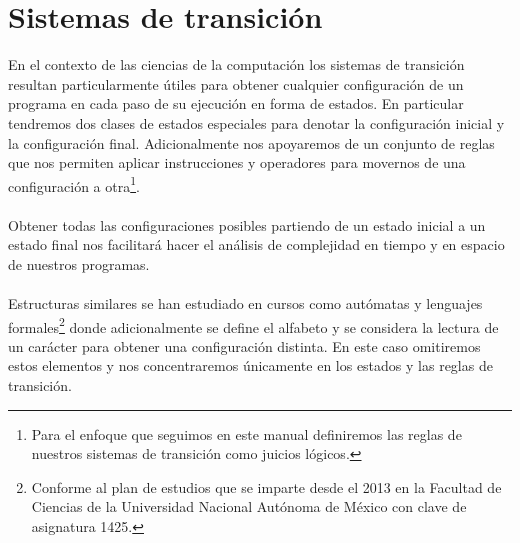 \section{Sistemas de transición}
    En el contexto de las ciencias de la computación los sistemas de transición resultan particularmente útiles para obtener cualquier configuración de un programa en cada paso de su ejecución en forma de estados. En particular tendremos dos clases de estados especiales para denotar la configuración inicial y la configuración final. Adicionalmente nos apoyaremos de un conjunto de reglas que nos permiten aplicar instrucciones y operadores para movernos de una configuración a otra\footnote{ Para el enfoque que seguimos en este manual definiremos las reglas de nuestros sistemas de transición como juicios lógicos.}.\\\\
    Obtener todas las configuraciones posibles partiendo de un estado inicial a un estado final nos facilitará hacer el análisis de complejidad en tiempo y en espacio de nuestros programas.\\\\
    Estructuras similares se han estudiado en cursos como autómatas y lenguajes formales\footnote{Conforme al plan de estudios que se imparte desde el 2013 en la Facultad de Ciencias de la Universidad Nacional Autónoma de México con clave de asignatura 1425. } donde adicionalmente se define el alfabeto y se considera la lectura de un carácter para obtener una configuración distinta. En este caso omitiremos estos elementos y nos concentraremos únicamente en los estados y las reglas de transición.

